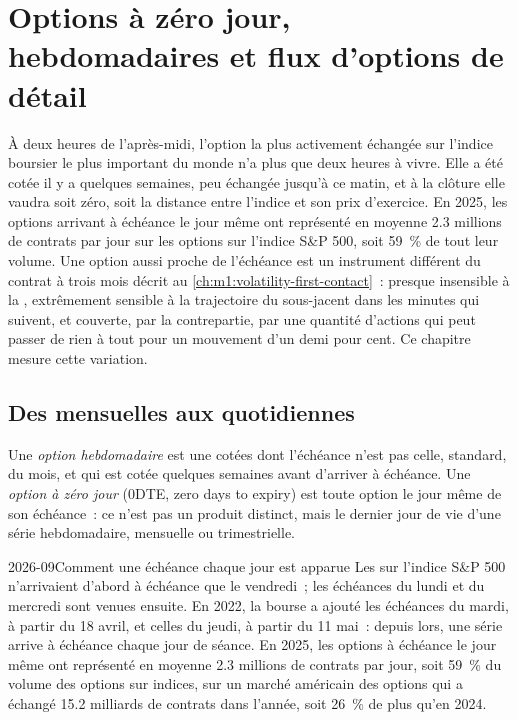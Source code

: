 \chapter{Options à zéro jour, hebdomadaires et flux d'options de détail}\label{ch:m1:zero-day-options-and-retail-flow}

À deux heures de l'après-midi, l'option la plus activement échangée sur l'indice
boursier le plus important du monde n'a plus que deux heures à vivre. Elle a été cotée il y a
quelques semaines, peu échangée jusqu'à ce matin, et à la clôture elle vaudra
soit zéro, soit la distance entre l'indice et son prix d'exercice. En
2025, les options arrivant à échéance le jour même ont représenté en moyenne 2.3 millions de contrats par jour
sur les options sur l'indice S\&P 500, soit 59~\% de tout leur volume. Une option aussi proche de
l'échéance est un instrument différent du contrat à trois mois décrit au
\cref{ch:m1:volatility-first-contact}~: presque insensible à la ,
extrêmement sensible à la trajectoire du sous-jacent dans les minutes
qui suivent, et couverte, par la contrepartie, par une quantité
d'actions qui peut passer de rien à tout pour un mouvement
d'un demi pour cent. Ce chapitre mesure cette variation.

\section{Des mensuelles aux quotidiennes}

\begin{definition}\label{def:m1:zero-day-options-and-retail-flow:zero}
Une \emph{option hebdomadaire} est une  cotées
dont l'échéance n'est pas celle, standard, du mois, et qui est cotée quelques semaines avant
d'arriver à échéance. Une \emph{option à zéro jour} (0DTE, zero days to
expiry) est toute option le jour même de son échéance~: ce n'est pas un produit distinct, mais
le dernier jour de vie d'une série hebdomadaire, mensuelle ou trimestrielle.
\end{definition}

\begin{dated}{2026-09}{Comment une échéance chaque jour est apparue}\label{dat:m1:zero-day-options-and-retail-flow:dailies}
Les  sur l'indice S\&P 500 n'arrivaient d'abord à échéance que le vendredi~;
les échéances du lundi et du mercredi sont venues ensuite. En 2022, la bourse a ajouté les échéances du mardi, à partir du 18 avril, et
celles du jeudi, à partir du 11 mai~: depuis lors, une série arrive à échéance
chaque jour de séance. En 2025, les options à échéance le jour même ont représenté en moyenne 2.3 millions de contrats par jour,
soit 59~\% du volume des options sur indices, sur un marché américain des options qui a échangé
15.2 milliards de contrats dans l'année, soit 26~\% de plus qu'en 2024.
\end{dated}

